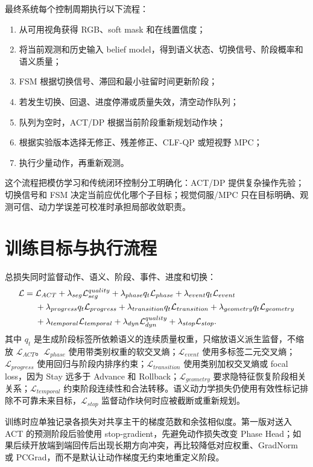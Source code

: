 \documentclass[UTF8,a4paper,11pt]{ctexart}
\begin{document}
最终系统每个控制周期执行以下流程：
\begin{enumerate}[leftmargin=2.3em]
  \item 从可用视角获得 RGB、soft mask 和在线置信度；
  \item 将当前观测和历史输入 belief model，得到语义状态、切换信号、阶段概率和语义质量；
  \item FSM 根据切换信号、滞回和最小驻留时间更新阶段；
  \item 若发生切换、回退、进度停滞或质量失效，清空动作队列；
  \item 队列为空时，ACT/DP 根据当前阶段重新规划动作块；
  \item 根据实验版本选择无修正、残差修正、CLF-QP 或短视野 MPC；
  \item 执行少量动作，再重新观测。
\end{enumerate}
这个流程把模仿学习和传统闭环控制分工明确化：ACT/DP 提供复杂操作先验；切换信号和 FSM 决定当前应优化哪个子目标；视觉伺服/MPC 只在目标明确、观测可信、动力学误差可校准时承担局部收敛职责。

\section{训练目标与执行流程}

总损失同时监督动作、语义、阶段、事件、进度和切换：
\begin{align}
\mathcal L={}&\mathcal L_{ACT}
+\lambda_{seg}\mathcal L_{seg}^{quality}
+\lambda_{phase}q_t\mathcal L_{phase}
+\lambda_{event}q_t\mathcal L_{event}\notag\\
&+\lambda_{progress}q_t\mathcal L_{progress}
+\lambda_{transition}q_t\mathcal L_{transition}
+\lambda_{geometry}q_t\mathcal L_{geometry}\notag\\
&+\lambda_{temporal}\mathcal L_{temporal}
+\lambda_{dyn}\mathcal L_{dyn}^{quality}
+\lambda_{stop}\mathcal L_{stop}.
\end{align}
其中 $q_t$ 是生成阶段标签所依赖语义的连续质量权重，只缩放语义派生监督，不缩放 $\mathcal L_{ACT}$。$\mathcal L_{phase}$ 使用带类别权重的软交叉熵；$\mathcal L_{event}$ 使用多标签二元交叉熵；$\mathcal L_{progress}$ 使用回归与阶段内排序约束；$\mathcal L_{transition}$ 使用类别加权交叉熵或 focal loss，因为 Stay 远多于 Advance 和 Rollback；$\mathcal L_{geometry}$ 要求隐特征恢复阶段相关关系；$\mathcal L_{temporal}$ 约束阶段连续性和合法转移。语义动力学损失仍使用有效性标记排除不可靠未来目标，$\mathcal L_{stop}$ 监督动作块何时应被截断或重新规划。

训练时应单独记录各损失对共享主干的梯度范数和余弦相似度。第一版对送入 ACT 的预测阶段后验使用 stop-gradient，先避免动作损失改变 Phase Head；如果后续开放端到端回传后出现长期方向冲突，再比较降低对应权重、GradNorm 或 PCGrad，而不是默认让动作梯度无约束地重定义阶段。
\end{document}
